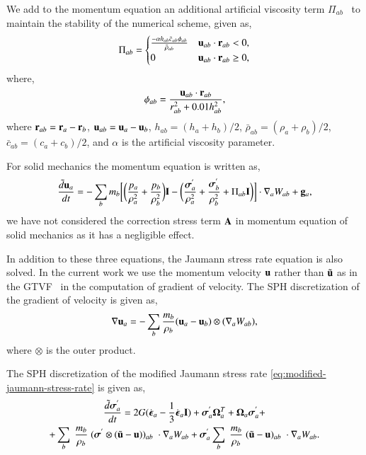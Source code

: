 We add to the momentum equation an additional artificial viscosity term
$\Pi_{ab}$~\citep{monaghan-review:2005} to maintain the stability of the
numerical scheme, given as,
\begin{align}
  \label{eq:mom-av}
  \Pi_{ab} =
  \begin{cases}
\frac{-\alpha h_{ab} \bar{c}_{ab} \phi_{ab}}{\bar{\rho}_{ab}}
  & \mathbf{u}_{ab}\cdot \mathbf{r}_{ab} < 0, \\
  0 & \mathbf{u}_{ab}\cdot \mathbf{r}_{ab} \ge 0,
\end{cases}
\end{align}
where,
%
\begin{equation}
  \label{eq:av-phiij}
  \phi_{ab} = \frac{\mathbf{u}_{ab} \cdot \mathbf{r}_{ab}}{r^2_{ab} + 0.01 h^2_{ab}},
\end{equation}
%
where $\mathbf{r}_{ab} = \mathbf{r}_a - \mathbf{r}_b$, $\mathbf{u}_{ab} = \mathbf{u}_a -
\mathbf{u}_b$, $h_{ab} = (h_a + h_b)/2$, $\bar{\rho}_{ab} = (\rho_a + \rho_b)/2$,
$\bar{c}_{ab} = (c_a + c_b) / 2$, and $\alpha$ is the artificial
viscosity parameter.

%
For solid mechanics the momentum equation is written as,
\begin{equation}
  \label{eq:sph-momentum-solid}
  \frac{\tilde{d}\mathbf{u}_{a}}{dt} = - \sum_{b} m_b \bigg[
  \bigg(\frac{p_a}{\rho_a^2} + \frac{p_b}{\rho_b^2}\bigg) \mathbf{I} -
  \bigg(\frac{\boldsymbol{\sigma}^{'}_{a}}{\rho_a^2} +
  \frac{\boldsymbol{\sigma}^{'}_{b}}{\rho_b^2} + \Pi_{ab} \mathbf{I} \bigg) \bigg]  \cdot \nabla_{a} W_{ab} +
  \mathbf{g}_{a},
\end{equation}
we have not considered the correction stress term $\mathbf{A}$ in momentum
equation of solid mechanics as it has a negligible effect.

In addition to these three equations, the Jaumann stress rate equation is also
solved. In the current work we use the momentum velocity $\mathbf{u}$ rather than
$\tilde{\mathbf{u}}$ as in the GTVF~\citep{zhang_hu_adams17} in the computation of
gradient of velocity. The SPH discretization of the gradient of velocity is
given as,
\begin{equation}
  \label{eq:sph-vel-grad}
  \nabla \mathbf{u}_a =
  - \sum_{b} \frac{m_b}{\rho_{b}} (\mathbf{u}_{a} - \mathbf{u}_{b}) \otimes (\nabla_{a} W_{ab}),
\end{equation}
where $\otimes$ is the outer product.

The SPH discretization of the modified Jaumann stress rate
\cref{eq:modified-jaumann-stress-rate} is given as,
\begin{multline}
  \label{eq:sph-modified-jaumann-stress}
  \frac{\tilde{d}\boldsymbol{\sigma}^{'}_{a}}{dt} = 2G (\dot{\boldsymbol{\epsilon}}_{a} -
  \frac{1}{3} \dot{\boldsymbol{\epsilon}}_{a} \mathbf{I}) + \boldsymbol{\sigma}^{'}_{a}
  \boldsymbol{\Omega}_{a}^{T} +
  \boldsymbol{\Omega}_{a} \boldsymbol{\sigma}^{'}_{a} + \\
  + \sum_{b} \; \frac{m_b}{\rho_{b}} \; (\boldsymbol{\sigma}^{'} \otimes (\tilde{\mathbf{u}} -
  \mathbf{u}))_{ab} \; \cdot \nabla_{a} W_{ab}
  + \boldsymbol{\sigma}^{'}_{a} \sum_{b} \; \frac{m_b}{\rho_{b}} \;
  (\tilde{\mathbf{u}} - \mathbf{u})_{ab} \; \cdot \nabla_{a} W_{ab}.
\end{multline}



